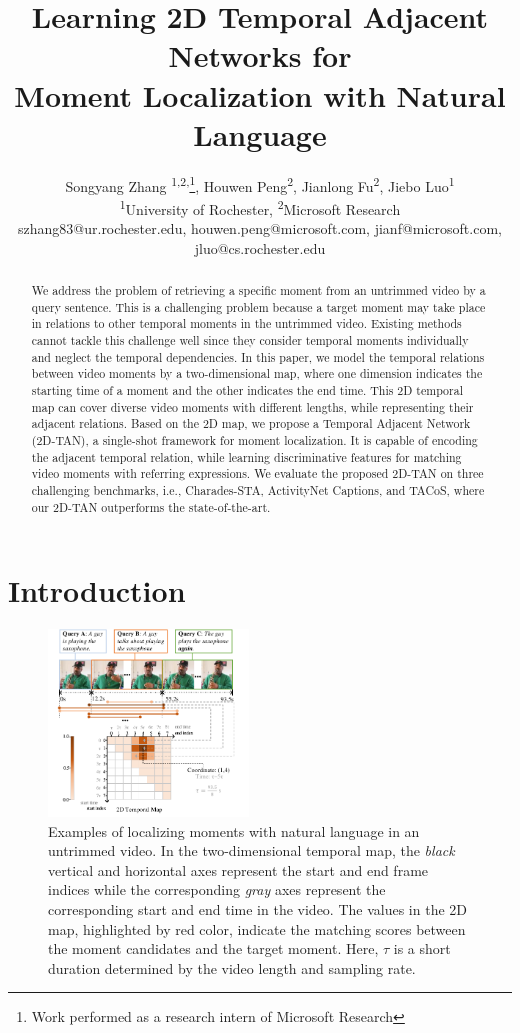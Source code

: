 \documentclass[letterpaper]{article} %
\title{Learning 2D Temporal Adjacent Networks for \\ Moment Localization with Natural Language}
\author{Songyang Zhang \textsuperscript{\rm 1,2,}\thanks{Work performed as a research intern of Microsoft Research},
Houwen Peng\textsuperscript{\rm 2},
Jianlong Fu\textsuperscript{\rm 2},
Jiebo Luo\textsuperscript{\rm 1}\\
\textsuperscript{\rm 1}University of Rochester,
\textsuperscript{\rm 2}Microsoft Research\\
szhang83@ur.rochester.edu,
houwen.peng@microsoft.com,
jianf@microsoft.com,
jluo@cs.rochester.edu
}
\begin{document}
\maketitle

\begin{abstract}

We address the problem of retrieving a specific moment from an untrimmed video by a query sentence. This is a challenging problem because a target moment may take place in relations to other temporal moments in the untrimmed video. Existing methods cannot tackle this challenge well since they consider temporal moments individually and neglect the temporal dependencies. In this paper, we model the temporal relations between video moments by a two-dimensional map, where one dimension indicates the starting time of a moment and the other indicates the end time. This 2D temporal map can cover diverse video moments with different lengths, while representing their adjacent relations. Based on the 2D map, we propose a Temporal Adjacent Network (2D-TAN), a single-shot framework for moment localization. It is capable of encoding the adjacent temporal relation, while learning discriminative features for matching video moments with referring expressions. We evaluate the proposed 2D-TAN on three challenging benchmarks, i.e., Charades-STA, ActivityNet Captions, and TACoS, where our 2D-TAN outperforms the state-of-the-art.

\end{abstract}

\section{Introduction}


\begin{figure}[t!]
\centering
\includegraphics[width=0.475\textwidth]{task.pdf}
\caption{Examples of localizing moments with natural language in an untrimmed video.
In the two-dimensional temporal map, the \textit{black} vertical and horizontal axes represent the start and end frame indices while the corresponding \textit{gray} axes represent the corresponding start and end time in the video.
The values in the 2D map, highlighted by red color, indicate the matching scores between the moment candidates and the target moment.
Here, $\tau$ is a short duration determined by the video length and sampling rate.
}
\label{fig:task}
\end{figure}
\end{document}

